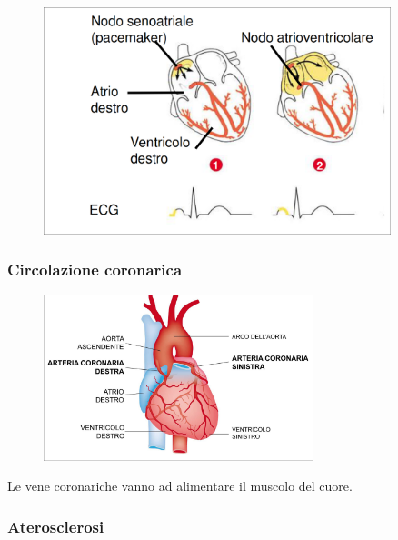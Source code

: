 \documentclass[a4paper]{article}
\begin{document}
\begin{center}
\begin{figure}[th]
    \centering
    \includegraphics[width=0.9\textwidth]{./pacemaker.png}
\end{figure}
\end{center}

\pagebreak

\subsubsection{Circolazione coronarica}

\begin{center}
\begin{figure}[th]
    \centering
    \includegraphics[width=0.7\textwidth]{./circolazione_coronarica.png}
\end{figure}
\end{center}

Le vene coronariche vanno ad alimentare il muscolo del cuore.

\subsubsection{Aterosclerosi}
\end{document}

